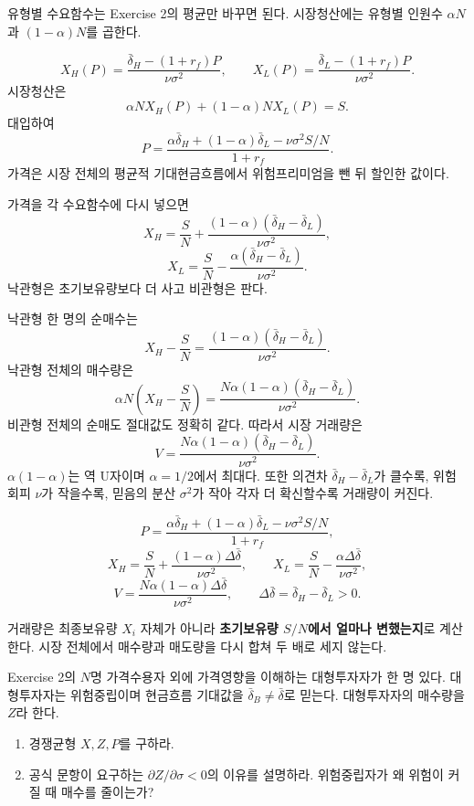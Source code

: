 \begin{strategybox}
유형별 수요함수는 Exercise 2의 평균만 바꾸면 된다. 시장청산에는 유형별 인원수 $\alpha N$과 $(1-\alpha)N$를 곱한다.
\end{strategybox}

\begin{solutionbox}
\[
X_H(P)=\frac{\bar\delta_H-(1+r_f)P}{\nu\sigma^2},
\qquad
X_L(P)=\frac{\bar\delta_L-(1+r_f)P}{\nu\sigma^2}.
\]
시장청산은
\[
\alpha NX_H(P)+(1-\alpha)NX_L(P)=S.
\]
대입하여
\[
\boxed{P=
\frac{\alpha\bar\delta_H+(1-\alpha)\bar\delta_L-\nu\sigma^2S/N}{1+r_f}}.
\]
가격은 시장 전체의 평균적 기대현금흐름에서 위험프리미엄을 뺀 뒤 할인한 값이다.

가격을 각 수요함수에 다시 넣으면
\[
\boxed{X_H=\frac SN+\frac{(1-\alpha)(\bar\delta_H-\bar\delta_L)}{\nu\sigma^2}},
\]
\[
\boxed{X_L=\frac SN-\frac{\alpha(\bar\delta_H-\bar\delta_L)}{\nu\sigma^2}}.
\]
낙관형은 초기보유량보다 더 사고 비관형은 판다.

낙관형 한 명의 순매수는
\[
X_H-\frac SN=\frac{(1-\alpha)(\bar\delta_H-\bar\delta_L)}{\nu\sigma^2}.
\]
낙관형 전체의 매수량은
\[
\alpha N\left(X_H-\frac SN\right)
=\frac{N\alpha(1-\alpha)(\bar\delta_H-\bar\delta_L)}{\nu\sigma^2}.
\]
비관형 전체의 순매도 절대값도 정확히 같다. 따라서 시장 거래량은
\[
\boxed{V=\frac{N\alpha(1-\alpha)(\bar\delta_H-\bar\delta_L)}{\nu\sigma^2}}.
\]
$\alpha(1-\alpha)$는 역 U자이며 $\alpha=1/2$에서 최대다. 또한 의견차 $\bar\delta_H-\bar\delta_L$가 클수록, 위험회피 $\nu$가 작을수록, 믿음의 분산 $\sigma^2$가 작아 각자 더 확신할수록 거래량이 커진다.
\end{solutionbox}

\begin{answerbox}
\[
P=\frac{\alpha\bar\delta_H+(1-\alpha)\bar\delta_L-\nu\sigma^2S/N}{1+r_f},
\]
\[
X_H=\frac SN+\frac{(1-\alpha)\Delta\bar\delta}{\nu\sigma^2},
\qquad
X_L=\frac SN-\frac{\alpha\Delta\bar\delta}{\nu\sigma^2},
\]
\[
V=\frac{N\alpha(1-\alpha)\Delta\bar\delta}{\nu\sigma^2},\qquad
\Delta\bar\delta=\bar\delta_H-\bar\delta_L>0.
\]
\end{answerbox}

\begin{warningbox}
거래량은 최종보유량 $X_i$ 자체가 아니라 \textbf{초기보유량 $S/N$에서 얼마나 변했는지}로 계산한다. 시장 전체에서 매수량과 매도량을 다시 합쳐 두 배로 세지 않는다.
\end{warningbox}

\begin{officialbox}
Exercise 2의 $N$명 가격수용자 외에 가격영향을 이해하는 대형투자자가 한 명 있다. 대형투자자는 위험중립이며 현금흐름 기대값을 $\bar\delta_B\ne\bar\delta$로 믿는다. 대형투자자의 매수량을 $Z$라 한다.
\begin{enumerate}[label=(\alph*)]
\item 경쟁균형 $X,Z,P$를 구하라.
\item 공식 문항이 요구하는 $\partial Z/\partial\sigma<0$의 이유를 설명하라. 위험중립자가 왜 위험이 커질 때 매수를 줄이는가?
\end{enumerate}
\end{officialbox}

